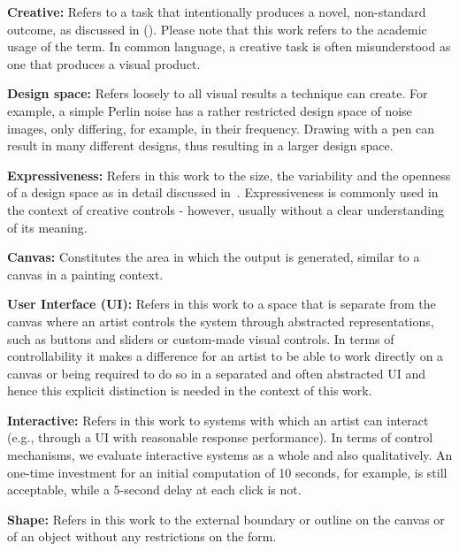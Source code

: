 \textbf{Creative:} Refers to a task that intentionally produces a novel, non-standard outcome, as discussed in (). Please note that this work refers to the academic usage of the term. In common language, a creative task is often misunderstood as one that produces a visual product.

\textbf{Design space:} Refers loosely to all visual results a technique can create. For example, a simple Perlin noise has a rather restricted design space of noise images, only differing, for example, in their frequency. Drawing with a pen can result in many different designs, thus resulting in a larger design space.

\textbf{Expressiveness:} Refers in this work to the size, the variability and the openness of a design space as in detail discussed in~. Expressiveness is commonly used in the context of creative controls - however, usually without a clear understanding of its meaning.


\textbf{Canvas:} Constitutes the area in which the output is generated, similar to a canvas in a painting context.

\textbf{User Interface (UI):} Refers in this work to a space that is separate from the canvas where an artist controls the system through abstracted representations, such as buttons and sliders or custom-made visual controls. In terms of controllability it makes a difference for an artist to be able to work directly on a canvas or being required to do so in a separated and often abstracted UI and hence this explicit distinction is needed in the context of this work.

\textbf{Interactive:} Refers in this work to systems with which an artist can interact (e.g., through a UI with reasonable response performance). In terms of control mechanisms, we evaluate interactive systems as a whole and also qualitatively. An one-time investment for an initial computation of 10 seconds, for example, is still acceptable, while a 5-second delay at each click is not.

\textbf{Shape:} Refers in this work to the external boundary or outline on the canvas or of an object without any restrictions on the form. 

